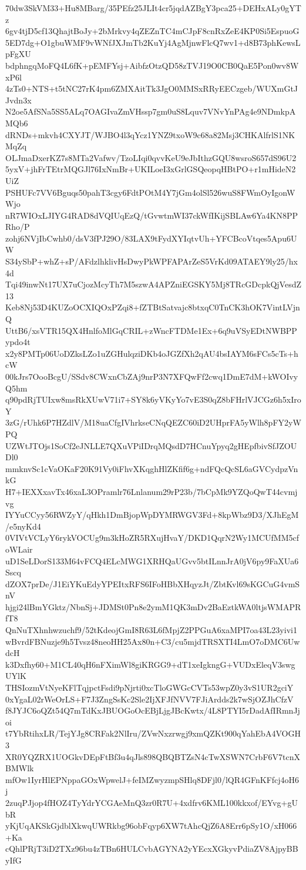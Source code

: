 70dw3SkVM33+Hu8MBarg/35PEfz25JLIt4cr5jqdAZBgY3pca25+DEHxALy0gYTz
6gv4tjD5cf13QhajtBoJy+2bMrkvy4qZEZnTC4mCJpF8cnRxZeE4KP0Si5EspuoG
5ED7dg+O1gbuWMF9vWNfJXJmTb2KuYj4AgMjnwFlcQ7wv1+d8B73phKewsLpFgXU
bdphngqMoFQ4L6fK+pEMFYsj+AibfzOtzQD58zTVJ19O0CB0QaE5Pon0wv8WxP6l
4zTs0+NTS+t5tNC27rK4pm6ZMXAitTk3JgO0MMSxRRyEECzgeb/WUXmGtJJvdn3x
N2oe5AfSNa5SS5ALq7OAGIvaZmVHssp7gm0uS8Lquv7VNvYnPAg4e9NDmkpAMQb6
dRNDs+mkvh4CXYJT/WJBO4l3qYcz1YNZ9txoW9c68a82Msj3CHKAlfrlS1NKMqZq
OLJmaDxerKZ7s8MTa2Vafwv/TzoLIqi0qvvKeU9eJbIthzGQU8wsroS657dS96U2
5yxV+jhFrTEtrMQGJl76IxNmBr+UKILoeI3xGrlGSQeopqHBtPO+r1mHideN2UiZ
PSHUFc7VV6Bguqs50pahT3cgy6FdtPOtM4Y7jGm4olSl526wuS8FWmOyIgonWWjo
nR7WIOxLJIYG4RAD8dVQIUqEzQ/tGvwtmWI37ckWfIKijSBLAw6Ya4KN8PPRho/P
zohj6NVjIbCwhb0/dsV3fPJ29O/83LAX9tFydXYIqtvUh+YFCBcoVtqes5Apu6UW
S34ySbP+whZ+sP/AFdzlhklivHsDwyPkWPFAPArZeS5VrKd09ATAEY9ly25/hx4d
Tqi49inwNt17UX7uCjozMcyTh7M5szwA4APZniEGSKY5Mj8TRcGDcpkQjVesdZ13
Keb8Nj53D4KUZoOCXIQOxPZqi8+fZTBtSatvajc8btxqC0TnCK3hOK7VintLVjnQ
UttB6/xsVTR15QX4HnlfoMlGqCRIL+zWncFTDMe1Ex+6q9uVSyEDtNWBPPypdo4t
x2y8PMTp06UoDZksLZo1uZGHulqziDKb4oJGZfXh2qAU4bsIAYM6sFCs5cTs+hcW
00kJrs7OooBcgU/SSdv8CWxnCbZAj9nrP3N7XFQwFf2cwq1DmE7dM+kWOIvyQ5hm
q90pdRjTUIxw8msRkXUwV71i7+SY8k6yVKyYo7vE3S0qZ8bFHrlVJCGz6h5xIroY
3zG/rUhk6P7HZdlV/M18uaCfgIVhrkseCNqQEZC60iD2UHprFA5yWlh8pFY2yWPQ
UZWtJTOjs1SoCf2eJNLLE7QXuVPiIDrqMQsdD7HCnuYpyq2gHEpfbivSfJZOUDl0
mmknvSc1cVaOKaF20K91Vy0iFhvXKqghHlZKfif6g+ndFQcQcSL6aGVCydpzVnkG
H7+IEXXxavTx46xaL3OPramlr76Lnlanum29rP23b/7bCpMk9YZQoQwT44cvmjvg
IYYuCCyy56RWZyY/qHkh1DmBjopWpDYMRWGV3Fd+8kpWbz9D3/XJhEgM/e5nyKd4
0VIVtVCLyY6rykVOCUg9m3kHoZR5RXujHvaY/DKD1QqrN2Wy1MCUfMM5cfoWLair
uD1SeLDorS133M64vFCQ4ELcMWG1XRHQaUGvv5btILnnJrA0jV6py9FaXUa6Sscq
dZOX7prDe/J1EiYKuEdyYPEItxRFS6IFoHBbXHqyzJt/ZbtKvl69sKGCuG4vmSnV
hjgi24lBmYGktz/NbnSj+JDMSt0Pn8e2ymM1QK3mDv2BaEztkWA0ltjsWMAPRfT8
QnNuTXhnhwzuchf9/52tKdeojGmI8R63L6fMpjZ2PPGuA6xaMPI7oa43L23yivi1
wBvrdFBNuzje9h5Tvsz48neoHH25Ax80n+C3/cu5mjdTRSXTI4LmO7oDMC6UwdcH
k3Dxfhy60+M1CL40qH6nFXimWl8giKRGG9+dT1xeIgkngG+VUDxEleqV3swgUYlK
THSIozmVtNyeKFlTqjpctFsdi9pNjrti0xcTloGWGcCVTs53wpZ0y3vS1UR2gciY
0xYgaL02rWeOrLS+F7J3ZngSsKc2Sle2IjXFJfNVV7FJiArdds2k7wSjOZJhCfzV
f8JYJC6oQZt54Q7mTdKxJBUOGoOcEBjLjgJBcKwtx/4L8PTYI5rDadAfIRmnJjoi
t7YbRtihxLR/TejYJg8CRFak2NlIru/ZVwNxzrwgj9xmQZKt900qYahEbA4VOGH3
XR0YQZRX1UOGkvDEpFtBf3u4qJls898QBQBTZsN4cTwXSWN7CrbF6V7tcnXBMWlk
mfOw1IyrHlEPNppaGOxWpwelJ+feIMZwyzmpSHlq8DFjl0/lQR4GFnKFfcj4oH6j
2zuqPJjop4fHOZ4TyYdrYCGAeMnQ3zr0R7U+4xdfrv6KML100kkxof/EYvg+gUbR
yKjUqAKSkGjdblXkwqUWRkbg96obFqyp6XW7tAhcQjZ6A8Err6pSy1O/xH066+Ka
cQhlPRjT3iD2TXz96bu4zTBn6HULCvbAGYNA2yYEcxXGkyvPdiaZV8AjpyBByIfG
